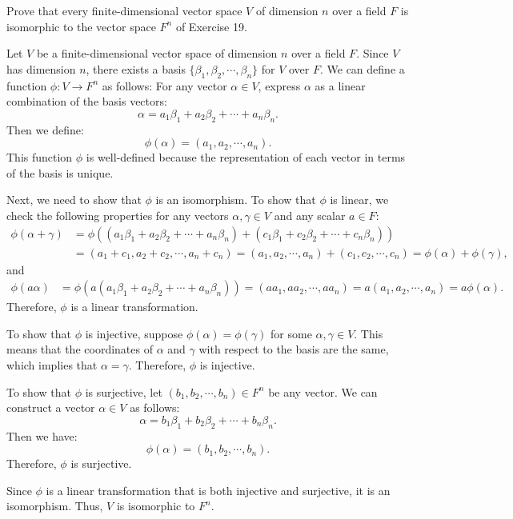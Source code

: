 \begin{problem}[33.23]
  Prove that every finite-dimensional vector space $V$ of dimension $n$ over a field $F$ is isomorphic to the vector space $F^n$ of Exercise 19.
\end{problem}

\begin{solution}
  Let $V$ be a finite-dimensional vector space of dimension $n$ over a field $F$. Since $V$ has dimension $n$, there exists a basis $\{\beta_1, \beta_2, \cdots, \beta_n\}$ for $V$ over $F$. We can define a function $\phi : V \to F^n$ as follows: For any vector $\alpha \in V$, express $\alpha$ as a linear combination of the basis vectors:
  \[%
    \alpha = a_1\beta_1 + a_2\beta_2 + \cdots + a_n\beta_n
  .\]%
  Then we define:
  \[%
    \phi(\alpha) = (a_1, a_2, \cdots, a_n)
  .\]%
  This function $\phi$ is well-defined because the representation of each vector in terms of the basis is unique.

  Next, we need to show that $\phi$ is an isomorphism. To show that $\phi$ is linear, we check the following properties for any vectors $\alpha, \gamma \in V$ and any scalar $a \in F$:
  \begin{align*}
    \phi(\alpha + \gamma) &= \phi((a_1\beta_1 + a_2\beta_2 + \cdots + a_n\beta_n) + (c_1\beta_1 + c_2\beta_2 + \cdots + c_n\beta_n)) \\
                          &= (a_1 + c_1, a_2 + c_2, \cdots, a_n + c_n) = (a_1, a_2, \cdots, a_n) + (c_1, c_2, \cdots, c_n) = \phi(\alpha) + \phi(\gamma)
  ,\end{align*}
  and
  \begin{align*}
    \phi(a\alpha) &= \phi(a(a_1\beta_1 + a_2\beta_2 + \cdots + a_n\beta_n)) = (aa_1, aa_2, \cdots, aa_n) = a(a_1, a_2, \cdots, a_n) = a\phi(\alpha)
  .\end{align*}
  Therefore, $\phi$ is a linear transformation.

  To show that $\phi$ is injective, suppose $\phi(\alpha) = \phi(\gamma)$ for some $\alpha, \gamma \in V$. This means that the coordinates of $\alpha$ and $\gamma$ with respect to the basis are the same, which implies that $\alpha = \gamma$. Therefore, $\phi$ is injective.

  To show that $\phi$ is surjective, let $(b_1, b_2, \cdots, b_n) \in F^n$ be any vector. We can construct a vector $\alpha \in V$ as follows:
  \[%
    \alpha = b_1\beta_1 + b_2\beta_2 + \cdots + b_n\beta_n
  .\]%
  Then we have:
  \[%
    \phi(\alpha) = (b_1, b_2, \cdots, b_n)
  .\]%
  Therefore, $\phi$ is surjective.

  Since $\phi$ is a linear transformation that is both injective and surjective, it is an isomorphism. Thus, $V$ is isomorphic to $F^n$.
\end{solution}

